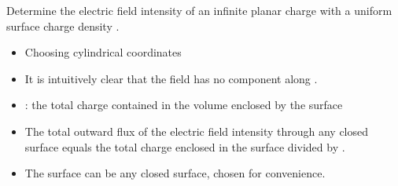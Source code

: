 \begin{ELexample}{}

Determine the electric field intensity of an infinite planar charge with a uniform surface charge density .


\begin{ELsolution}


\begin{itemize}
\tightlist
\item
  Choosing cylindrical coordinates
\end{itemize}


\begin{itemize}
\tightlist
\item
  It is intuitively clear that the field has no component along .
\end{itemize}


\end{ELsolution}

\end{ELexample}

\ELhold


\begin{ELunit}


\end{ELunit}

\begin{ELimportant}{}


\end{ELimportant}

\begin{ELunit}

\begin{itemize}
\tightlist
\item
  : the total charge contained in the volume  enclosed by the surface 
\item
  The total outward flux of the electric field intensity through any closed surface equals the total charge enclosed in the surface divided by .
\item
  The surface  can be any closed surface, chosen for convenience.
\end{itemize}

\end{ELunit}


